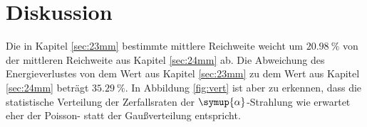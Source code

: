 \section{Diskussion}

Die in Kapitel \ref{sec:23mm} bestimmte mittlere Reichweite weicht um $\SI{20,98}{\%}$ von der mittleren Reichweite aus Kapitel \ref{sec:24mm} ab.
Die Abweichung des Energieverlustes von dem Wert aus Kapitel \ref{sec:23mm} zu dem Wert aus Kapitel \ref{sec:24mm} beträgt
$\SI{35,29}{\%}$.
In Abbildung \ref{fig:vert} ist aber zu erkennen, dass die statistische Verteilung der Zerfallsraten der $\symup{\alpha}$-Strahlung wie
erwartet eher der Poisson- statt der Gaußverteilung entspricht.
